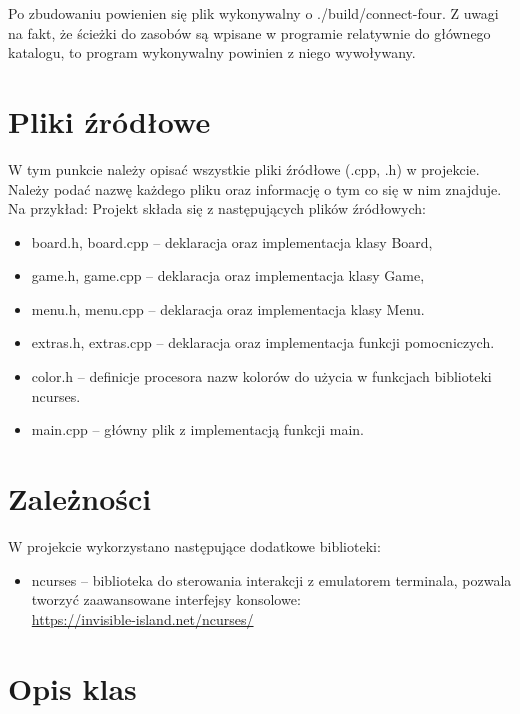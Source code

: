 \documentclass{article}
\begin{document}
Po zbudowaniu powienien się plik wykonywalny o ./build/connect-four. 
Z uwagi na fakt, że ścieżki do zasobów są wpisane w programie relatywnie 
do głównego katalogu, to program wykonywalny powinien z niego wywoływany.

\section{Pliki źródłowe}

W tym punkcie należy opisać wszystkie pliki źródłowe (.cpp, .h) w projekcie. Należy podać nazwę każdego pliku oraz informację o tym co się w nim znajduje. Na przykład:
Projekt składa się z następujących plików źródłowych:
    \begin{itemize}
    \item board.h, board.cpp – deklaracja oraz implementacja klasy Board,
    \item game.h, game.cpp – deklaracja oraz implementacja klasy Game,
    \item menu.h, menu.cpp – deklaracja oraz implementacja klasy Menu.
    \item extras.h, extras.cpp – deklaracja oraz implementacja funkcji pomocniczych.
    \item color.h – definicje procesora nazw kolorów do użycia w funkcjach biblioteki ncurses.
    \item main.cpp – główny plik z implementacją funkcji main.
    \end{itemize}

\section{Zależności}

W projekcie wykorzystano następujące dodatkowe biblioteki:
    \begin{itemize}
    \item ncurses – biblioteka do sterowania interakcji z emulatorem terminala,  
    pozwala  tworzyć zaawansowane interfejsy konsolowe: \\
    \url{https://invisible-island.net/ncurses/}
    \end{itemize}
\section{Opis klas}
\end{document}
